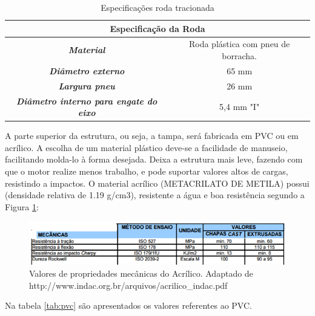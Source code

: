 			\begin{table}[H]
				\centering
				\caption{Especificações roda tracionada}
				\label{tab:especificacoes_roda}
				\begin{tabular}{|c|c|}
					\hline
					\multicolumn{2}{|c|}{\cellcolor[HTML]{C0C0C0}\textbf{Especificação da Roda}}                 \\ \hline
					\textit{\textbf{Material}}                             & Roda plástica com pneu de borracha. \\ \hline
					\textit{\textbf{Diâmetro externo}}                     & 65 mm                               \\ \hline
					\textit{\textbf{Largura pneu}}                         & 26 mm                               \\ \hline
					\textit{\textbf{Diâmetro interno para engate do eixo}} & 5,4 mm "I"                          \\ \hline
				\end{tabular}
			\end{table}

			A parte superior da estrutura, ou seja, a tampa, será fabricada em PVC ou em acrílico. A escolha de um material plástico deve-se a facilidade de manuseio, facilitando molda-lo à forma desejada. Deixa a estrutura mais leve, fazendo com que o motor realize menos trabalho, e pode suportar valores altos de cargas, resistindo a impactos. O material acrílico (METACRILATO DE METILA) possui (densidade relativa de 1.19 g/cm3), resistente a água e boa resistência segundo a Figura \ref{img:acrilico}:

			\begin{figure}[H]
				\centering
				\includegraphics[scale=0.8]{figuras/tabela_acrilico.png}
				\caption{Valores de propriedades mecânicas do Acrílico. Adaptado de http://www.indac.org.br/arquivos/acrilico\_indac.pdf}
				\label{img:acrilico}
			\end{figure}

			Na tabela \ref{tab:pvc} são apresentados os valores referentes ao PVC.

